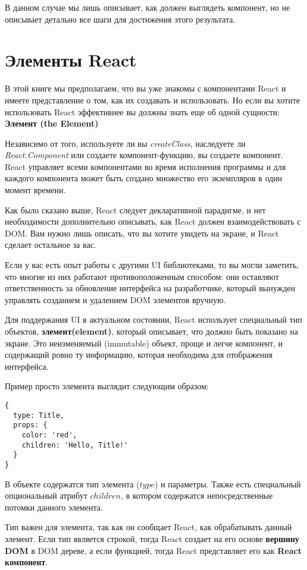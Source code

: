 В данном случае мы лишь описывает, как должен выглядеть компонент, но не описывает детально все шаги для достижения этого результата.

\section{Элементы React}

В этой книге мы предполагаем, что вы уже знакомы с компонентами React и имеете представление о том, как их создавать и использовать. Но если вы хотите использовать React эффективнее вы должны знать еще об одной сущности: \textbf{Элемент (the Element)}

Независимо от того, используете ли вы \textit{createClass}, наследуете ли \textit{React.Component} или создаете компонент-функцию, вы создаете компонент. React управляет всеми компонентами во время исполнения программы и для каждого компонента может быть создано множество его экземпляров в один момент времени.

Как было сказано выше, React следует декларативной парадигме, и нет необходимости дополнительно описывать, как React должен взаимодействовать с DOM. Вам нужно лишь описать, что вы хотите увидеть на экране, и React сделает остальное за вас.

Если у вас есть опыт работы с другими UI библиотеками, то вы могли заметить, что многие из них работают противоположенным способом: они оставляют ответственность за обновление интерфейса на разработчике, который вынужден управлять созданием и удалением DOM элементов вручную.

Для поддержания UI в актуальном состоянии, React использует специальный тип объектов, \textbf{элемент(element)}, который описывает, что должно быть показано на экране. Это неизменяемый (immutable) объект, проще и легче компонент, и содержащий ровно ту информацию, которая необходима для отображения интерфейса.

Пример просто элемента выглядит следующим образом:

\begin{lstlisting}
{
  type: Title,
  props: {
    color: 'red',
    children: 'Hello, Title!'
  }
}
\end{lstlisting}

В объекте содержатся тип элемента ($type$) и параметры. Также есть специальный опциональный атрибут $children$, в котором содержатся непосредственные потомки данного элемента.

Тип важен для элемента, так как он сообщает React, как обрабатывать данный элемент. Если тип является строкой, тогда React создает на его основе \textbf{вершину DOM} в DOM дереве, а если функцией, тогда React представляет его как \textbf{React компонент}.

